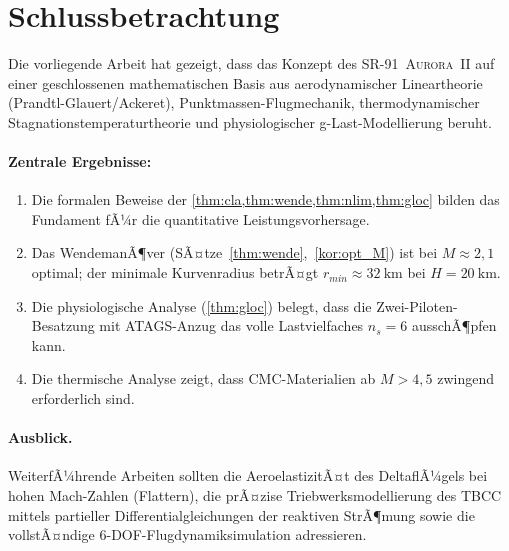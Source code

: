 ﻿\documentclass[12pt,a4paper]{article}
\theoremstyle{plain}
\theoremstyle{definition}
\theoremstyle{remark}
\newcommand{\SR}{\textsc{SR-91~Aurora~II}}
\begin{document}
\section*{Schlussbetrachtung}

Die vorliegende Arbeit hat gezeigt, dass das Konzept des \SR{} auf einer
geschlossenen mathematischen Basis aus aerodynamischer Lineartheorie
(Prandtl-Glauert/Ackeret), Punktmassen-Flugmechanik, thermodynamischer
Stagnationstemperaturtheorie und physiologischer g-Last-Modellierung beruht.

\paragraph{Zentrale Ergebnisse:}
\begin{enumerate}
  \item Die formalen Beweise der \cref{thm:cla,thm:wende,thm:nlim,thm:gloc}
        bilden das Fundament fÃ¼r die quantitative Leistungsvorhersage.
  \item Das WendemanÃ¶ver (SÃ¤tze~\ref{thm:wende},~\ref{kor:opt_M}) ist bei
        $M \approx 2{,}1$ optimal; der minimale Kurvenradius betrÃ¤gt
        $r_{min} \approx \SI{32}{\kilo\metre}$ bei $H = \SI{20}{\kilo\metre}$.
  \item Die physiologische Analyse (\cref{thm:gloc}) belegt, dass die
        Zwei-Piloten-Besatzung mit ATAGS-Anzug das volle Lastvielfaches
        $n_s = 6$ ausschÃ¶pfen kann.
  \item Die thermische Analyse zeigt, dass CMC-Materialien ab $M > 4{,}5$
        zwingend erforderlich sind.
\end{enumerate}

\paragraph{Ausblick.}
WeiterfÃ¼hrende Arbeiten sollten die AeroelastizitÃ¤t des DeltaflÃ¼gels bei
hohen Mach-Zahlen (Flattern), die prÃ¤zise Triebwerksmodellierung des TBCC
mittels partieller Differentialgleichungen der reaktiven StrÃ¶mung sowie
die vollstÃ¤ndige 6-DOF-Flugdynamiksimulation adressieren.

\end{document}
